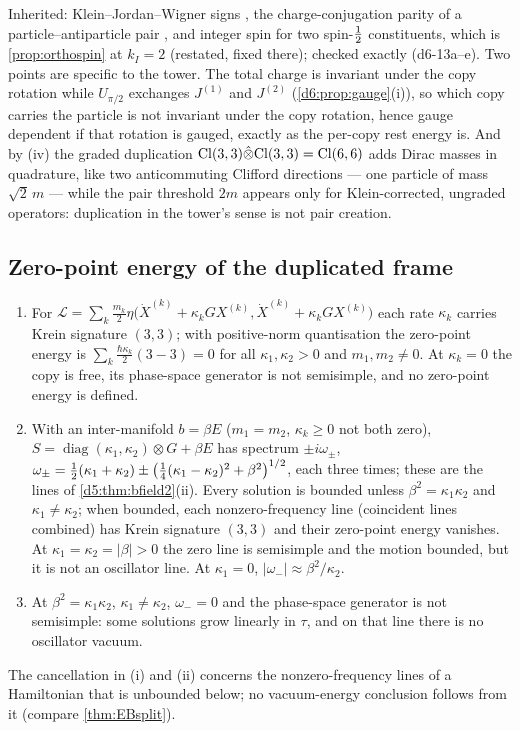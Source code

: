 Inherited: Klein--Jordan--Wigner signs \cite{JordanWigner28}, the charge-conjugation parity of a particle--antiparticle pair
\cite{WeinbergQFT}, and integer spin for two spin-$\tfrac12$ constituents, which is \cref{prop:orthospin} at $k_I=2$ (restated, fixed
there); checked exactly (d6-13a--e). Two points are specific to the tower. The total charge is invariant under the copy rotation while
$U_{\pi/2}$ exchanges $J^{(1)}$ and $J^{(2)}$ (\cref{d6:prop:gauge}(i)), so which copy carries the particle is not invariant under the copy rotation, hence gauge dependent if that rotation is gauged, exactly as the
per-copy rest energy is. And by (iv) the graded duplication $\mathrm{Cl}(3,3)\hat\otimes\mathrm{Cl}(3,3)=\mathrm{Cl}(6,6)$ adds Dirac masses in quadrature, like two
anticommuting Clifford directions --- one particle of mass $\sqrt2\,m$ --- while the pair threshold $2m$ appears only for Klein-corrected,
ungraded operators: duplication in the tower's sense is not pair creation.

\subsection{Zero-point energy of the duplicated frame}
\label{d6:sec:zpe}

\begin{proposition}
\label{d6:prop:zpe}
\begin{enumerate}[label=(\roman*),leftmargin=2.2em]
\item For $\mathcal L=\sum_k\frac{m_k}2\eta\bigl(\dot X^{(k)}+\kappa_kGX^{(k)},\dot X^{(k)}+\kappa_kGX^{(k)}\bigr)$ each rate $\kappa_k$ carries Krein
signature $(3,3)$; with positive-norm quantisation the zero-point energy is $\sum_k\frac{\hbar\kappa_k}2(3-3)=0$ for all $\kappa_1,\kappa_2>0$ and $m_1,m_2\neq0$. At $\kappa_k=0$ the copy is free, its phase-space generator is not semisimple, and no zero-point energy is defined.
\item With an inter-manifold $b=\beta E$ ($m_1=m_2$, $\kappa_k\ge0$ not both zero), $S=\operatorname{diag}(\kappa_1,\kappa_2)\otimes G+\beta E$ has spectrum
$\pm i\omega_\pm$, $\omega_\pm=\tfrac12(\kappa_1+\kappa_2)\pm\bigl(\tfrac14(\kappa_1-\kappa_2)^2+\beta^2\bigr)^{1/2}$, each three times; these are the lines of \cref{d5:thm:bfield2}(ii). Every solution is
bounded unless $\beta^2=\kappa_1\kappa_2$ and $\kappa_1\neq\kappa_2$; when bounded, each nonzero-frequency line (coincident lines combined) has
Krein signature $(3,3)$ and their zero-point energy vanishes. At $\kappa_1=\kappa_2=|\beta|>0$ the zero line is semisimple and the motion
bounded, but it is not an oscillator line. At $\kappa_1=0$, $|\omega_-|\approx\beta^2/\kappa_2$.
\item At $\beta^2=\kappa_1\kappa_2$, $\kappa_1\neq\kappa_2$, $\omega_-=0$ and the phase-space generator is not semisimple: some solutions grow linearly
in $\tau$, and on that line there is no oscillator vacuum.
\end{enumerate}
The cancellation in (i) and (ii) concerns the nonzero-frequency lines of a Hamiltonian that is unbounded below; no vacuum-energy conclusion
follows from it (compare \cref{thm:EBsplit}).
\end{proposition}

